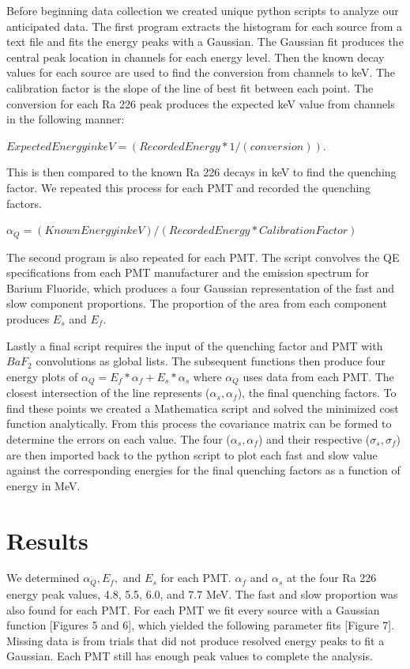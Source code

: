 \documentclass{article}
\begin{document}
Before beginning data collection we created unique python scripts to analyze our anticipated data. The first program extracts the histogram for each source from a text file and fits the energy peaks with a Gaussian. The Gaussian fit produces the central peak location in channels for each energy level. Then the known decay values for each source are used to find the conversion from channels to keV. The calibration factor is the slope of the line of best fit between each point. The conversion for each Ra 226 peak produces the expected keV value from channels in the following manner: 

\noindent
$ Expected Energy in keV = (Recorded Energy * 1/(conversion)) $. 

This is then compared to the known Ra 226 decays in keV to find the quenching factor. We repeated this process for each PMT and recorded the quenching factors. 

\noindent
$ \alpha_Q = (Known Energy in keV) / (Recorded Energy * Calibration Factor) $ 

The second program is also repeated for each PMT. The script convolves the QE specifications from each PMT manufacturer and the emission spectrum for Barium Fluoride, which produces a four Gaussian representation of the fast and slow component proportions. The proportion of the area from each component produces $E_s$ and $E_f$. 

Lastly a final script requires the input of the quenching factor and PMT with $BaF_2$ convolutions as global lists. The subsequent functions then produce four energy plots of $\alpha_Q = E_f * \alpha_f + E_s * \alpha_s$ where $\alpha_Q$ uses data from each PMT. The closest intersection of the line represents ($\alpha_s, \alpha_f$), the final quenching factors. To find these points we created a Mathematica script and solved the minimized cost function analytically. From this process the covariance matrix can be formed to determine the errors on each value. The four ($\alpha_s, \alpha_f$) and their respective ($\sigma_s, \sigma_f$) are then imported back to the python script to plot each fast and slow value against the corresponding energies for the final quenching factors as a function of energy in MeV. 
\section{Results}
We determined $\alpha_Q, E_f,$ and $E_s$ for each PMT. $\alpha_f$ and $\alpha_s$ at the four Ra 226 energy peak values, 4.8, 5.5, 6.0, and 7.7 MeV. The fast and slow proportion was also found for each PMT. For each PMT we fit every source with a Gaussian function [Figures 5 and 6], which yielded the following parameter fits [Figure 7]. Missing data is from trials that did not produce resolved energy peaks to fit a Gaussian. Each PMT still has enough peak values to complete the analysis. 
\end{document}
